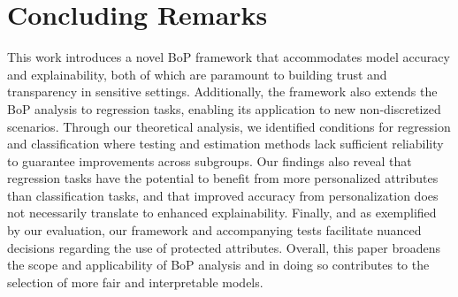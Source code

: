\section{Concluding Remarks}\label{sec:conclusion}

This work introduces a novel BoP framework that accommodates model accuracy and explainability, both of which are paramount to building trust and transparency in sensitive settings. Additionally, the framework also extends the BoP analysis to regression tasks, enabling its application to new non-discretized scenarios. 
Through our theoretical analysis, we identified conditions for regression and classification where testing and estimation methods lack sufficient reliability to guarantee improvements across subgroups. Our findings also reveal that regression tasks have the potential to benefit from more personalized attributes than classification tasks, and that improved accuracy from personalization does not necessarily translate to enhanced explainability. Finally, and as exemplified by our evaluation, our framework and accompanying tests facilitate nuanced decisions regarding the use of protected attributes.
Overall, this paper broadens the scope and applicability of BoP analysis and in doing so contributes to the selection of more fair and interpretable models.




